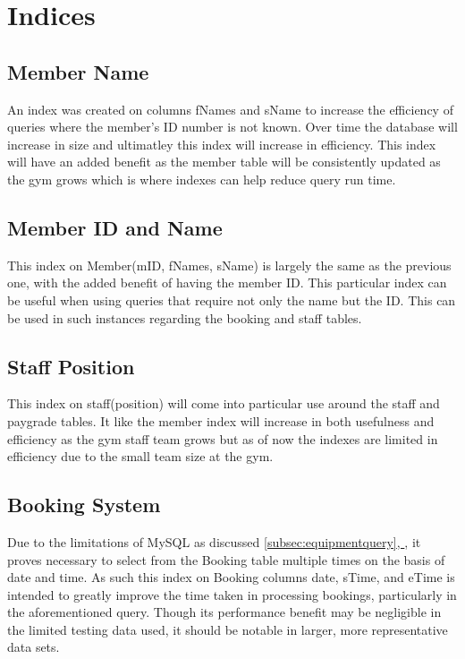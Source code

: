 \documentclass[a4paper, titlepage]{article}
\begin{document}
\section{Indices} \label{sec:indices}
\subsection{Member Name}
An index was created on columns fNames and sName to increase the efficiency of queries where the member's ID number is not known. Over time the database will increase in size and ultimatley this index will
increase in efficiency. This index will have an added benefit as the member table will be
consistently updated as the gym grows which is where indexes can help reduce query run time.
\subsection{Member ID and Name}
This index on Member(mID, fNames, sName) is largely the same as the previous one, with the added benefit of having the member ID. This particular index can be useful when using queries that require not only the name but the ID. This can be used in such instances regarding the booking and staff tables.
\subsection{Staff Position}
This index on staff(position) will come into particular use around the staff and paygrade tables. It like the member index will increase in both usefulness and efficiency as the gym staff team grows but as of now the indexes are limited in efficiency due to the small team size at the gym.
\subsection{Booking System}
Due to the limitations of MySQL as discussed \hyperref[subsec:equipmentquery]{\autoref*{subsec:equipmentquery}, }, it proves necessary to select from the Booking table multiple times on the basis of date and time. As such this index on Booking columns date, sTime, and eTime is intended to greatly improve the time taken in processing bookings, particularly in the aforementioned query. Though its performance benefit may be negligible in the limited testing data used, it should be notable in larger, more representative data sets.
\end{document}
